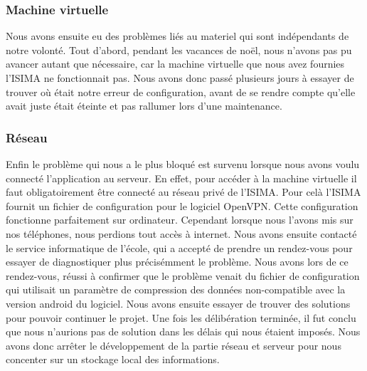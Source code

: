 \subsubsection{Machine virtuelle}
Nous avons ensuite eu des problèmes liés au materiel qui sont indépendants de notre volonté.
Tout d'abord, pendant les vacances de noël, nous n'avons pas pu avancer autant que nécessaire, car la machine virtuelle que nous avez fournies l'ISIMA ne fonctionnait pas.
Nous avons donc passé plusieurs jours à essayer de trouver où était notre erreur de configuration, avant de se rendre compte qu'elle avait juste était éteinte et pas rallumer lors d'une maintenance.
\subsubsection{Réseau}
Enfin le problème qui nous a le plus bloqué est survenu lorsque nous avons voulu connecté l'application au serveur. En effet, pour accéder à la machine virtuelle il faut obligatoirement être connecté au réseau privé de l'ISIMA.
Pour celà l'ISIMA fournit un fichier de configuration pour le logiciel OpenVPN. Cette configuration fonctionne parfaitement sur ordinateur. Cependant lorsque nous l'avons mis sur nos téléphones, nous perdions tout accès à internet.
Nous avons ensuite contacté le service informatique de l'école, qui a accepté de prendre un rendez-vous pour essayer de diagnostiquer plus précisémment le problème. Nous avons lors de ce rendez-vous, réussi à confirmer que le problème venait
du fichier de configuration qui utilisait un paramètre de compression des données non-compatible avec la version android du logiciel. Nous avons ensuite essayer de trouver des solutions pour pouvoir continuer le projet.
Une fois les délibération terminée, il fut conclu que nous n'aurions pas de solution dans les délais qui nous étaient imposés. Nous avons donc arrêter le développement de la partie réseau et serveur pour nous concenter sur un stockage local des informations.
